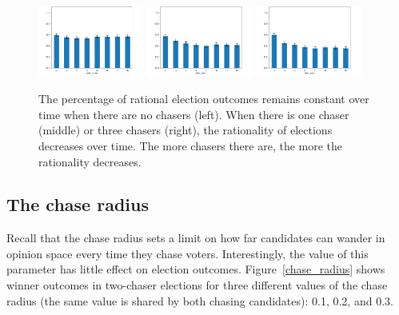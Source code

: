 \begin{figure}[ht]
	\centering
	\includegraphics[width=0.31\textwidth]{assets/all_party_0_chasers_rationality_stays_same.png}
	\includegraphics[width=0.31\textwidth]{assets/all_party_1_chaser_rationality_decreases.png}
	\includegraphics[width=0.31\textwidth]{assets/all_party_3_chasers_rationality_decreases.png}
	\caption{The percentage of rational election outcomes remains constant over time
		when there are no chasers (left). When there is one chaser (middle) or three chasers
		(right), the rationality of elections decreases over time. The more chasers there are,
		the more the rationality decreases.}
	\label{all_party_hurt_rat}
\end{figure}

\subsection{The chase radius}

Recall that the chase radius sets a limit on how far candidates can wander in
opinion space every time they chase voters. Interestingly, the value of this
parameter has little effect on election outcomes. Figure~\ref{chase_radius}
shows winner outcomes in two-chaser elections for three different values of the
chase radius (the same value is shared by both chasing candidates): 0.1, 0.2,
and 0.3.

